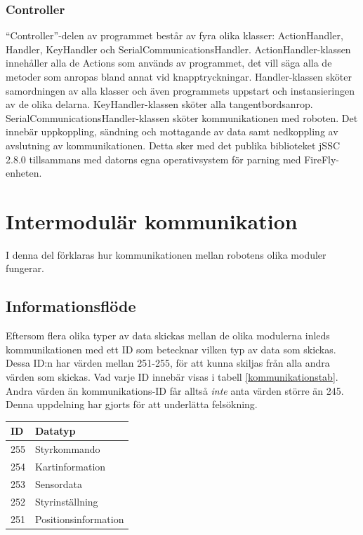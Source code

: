\documentclass[11pt]{article}
\begin{document}
\begin{flushleft}
\subsubsection{Controller}
``Controller''-delen av programmet består av fyra olika klasser: ActionHandler, Handler, KeyHandler och SerialCommunicationsHandler. 
ActionHandler-klassen innehåller alla de Actions som används av programmet, det vill säga alla de metoder som anropas bland annat vid knapptryckningar.
Handler-klassen sköter samordningen av alla klasser och även programmets uppstart och instansieringen av de olika delarna.
KeyHandler-klassen sköter alla tangentbordsanrop.
SerialCommunicationsHandler-klassen sköter kommunikationen med roboten. Det innebär uppkoppling, sändning och mottagande av data samt nedkoppling av avslutning av kommunikationen. Detta sker med det publika biblioteket jSSC 2.8.0 tillsammans med datorns egna operativsystem för parning med FireFly-enheten.

\pagebreak

\section{Intermodulär kommunikation}
I denna del förklaras hur kommunikationen mellan robotens olika moduler fungerar.

\subsection{Informationsflöde}
Eftersom flera olika typer av data skickas mellan de olika modulerna inleds kommunikationen med ett ID som betecknar vilken typ av data som skickas. Dessa ID:n har värden mellan 251-255, för att kunna skiljas från alla andra värden som skickas. Vad varje ID innebär visas i tabell \ref{kommunikationstab}. Andra värden än kommunikations-ID får alltså \emph{inte} anta värden större än 245. Denna uppdelning har gjorts för att underlätta felsökning.

\begin{longtable}[c]{| l | l |} \hline
  \centering
\textbf{ID} & \textbf{Datatyp} \\ \hline 
255 & Styrkommando \\ \hline
254 & Kartinformation \\ \hline
253 & Sensordata \\ \hline
252 & Styrinställning \\ \hline
251 & Positionsinformation \\ \hline


\end{longtable}
\end{flushleft}
\end{document}

